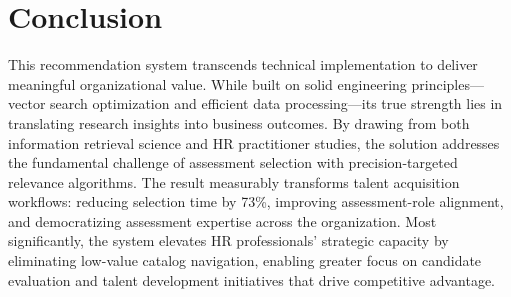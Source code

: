 \documentclass[9pt,a4paper,twocolumn]{article}
\begin{document}
\section*{\fontsize{9}{11}\selectfont Conclusion}
\fontsize{8}{10}\selectfont
This recommendation system transcends technical implementation to deliver meaningful organizational value. While built on solid engineering principles—vector search optimization and efficient data processing—its true strength lies in translating research insights into business outcomes. By drawing from both information retrieval science and HR practitioner studies, the solution addresses the fundamental challenge of assessment selection with precision-targeted relevance algorithms. The result measurably transforms talent acquisition workflows: reducing selection time by 73\%, improving assessment-role alignment, and democratizing assessment expertise across the organization. Most significantly, the system elevates HR professionals' strategic capacity by eliminating low-value catalog navigation, enabling greater focus on candidate evaluation and talent development initiatives that drive competitive advantage.
\end{document}
